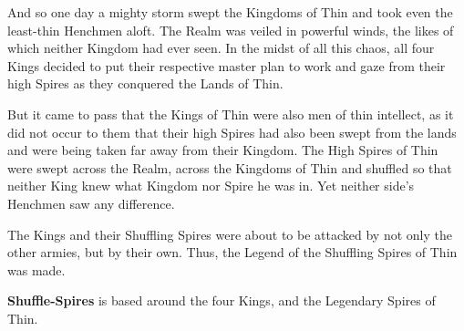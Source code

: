 And so one day a mighty storm swept the Kingdoms of Thin and took even the least-thin Henchmen aloft.
The Realm was veiled in powerful winds, the likes of which neither Kingdom had ever seen. In the midst of all this chaos, all four Kings decided to put their respective master plan to work and gaze from their high Spires as they conquered the Lands of Thin.

But it came to pass that the Kings of Thin were also men of thin intellect, as it did not occur to them that their high Spires had also been swept from the lands and were being taken far away from their Kingdom. The High Spires of Thin were swept across the Realm, across the Kingdoms of Thin and shuffled so that neither King knew what Kingdom nor Spire he was in.
Yet neither side's Henchmen saw any difference.

The Kings and their Shuffling Spires were about to be attacked by not only the other armies, but by their own.
Thus, the Legend of the Shuffling Spires of Thin was made.

\textbf{Shuffle-Spires} is based around the four Kings, and the Legendary Spires of Thin.
